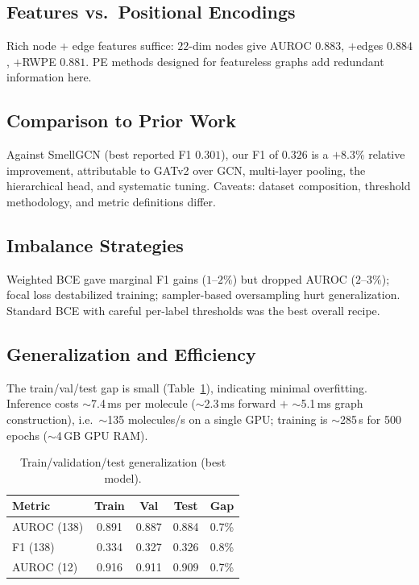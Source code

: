 \documentclass[10pt,twocolumn]{article}
\begin{document}
\subsection{Features vs.\ Positional Encodings}
Rich node + edge features suffice: $22$-dim nodes give AUROC $0.883$, $+$edges $0.884$, $+$RWPE $0.881$. PE methods designed for featureless graphs add redundant information here.

\subsection{Comparison to Prior Work}
Against SmellGCN (best reported F1 $0.301$), our F1 of $0.326$ is a $+8.3\%$ relative improvement, attributable to GATv2 over GCN, multi-layer pooling, the hierarchical head, and systematic tuning. Caveats: dataset composition, threshold methodology, and metric definitions differ.

\subsection{Imbalance Strategies}
Weighted BCE gave marginal F1 gains ($1$--$2\%$) but dropped AUROC ($2$--$3\%$); focal loss destabilized training; sampler-based oversampling hurt generalization. Standard BCE with careful per-label thresholds was the best overall recipe.

\subsection{Generalization and Efficiency}
The train/val/test gap is small (Table~\ref{tab:gen}), indicating minimal overfitting. Inference costs $\sim$7.4\,ms per molecule ($\sim$2.3\,ms forward $+$ $\sim$5.1\,ms graph construction), i.e.\ $\sim$135 molecules/s on a single GPU; training is $\sim$285\,s for 500 epochs ($\sim$4\,GB GPU RAM).

\begin{table}[t]
\centering\small
\caption{Train/validation/test generalization (best model).}
\label{tab:gen}
\begin{tabular}{lcccc}
\toprule
\textbf{Metric} & \textbf{Train} & \textbf{Val} & \textbf{Test} & \textbf{Gap} \\
\midrule
AUROC (138) & 0.891 & 0.887 & 0.884 & 0.7\% \\
F1 (138)    & 0.334 & 0.327 & 0.326 & 0.8\% \\
AUROC (12)  & 0.916 & 0.911 & 0.909 & 0.7\% \\
\bottomrule
\end{tabular}
\end{table}
\end{document}
